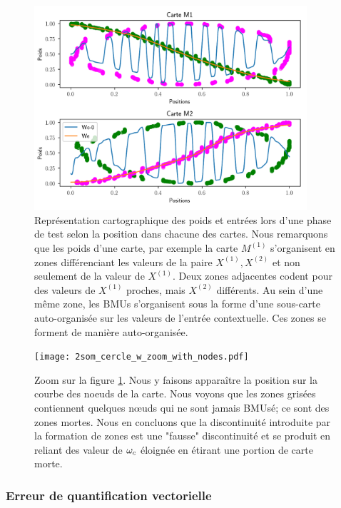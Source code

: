 \documentclass[../main]{subfiles}
\begin{document}
\begin{figure}
	\centering\includegraphics[width=0.9\textwidth]{2som_cercle_w.pdf}
	\caption{Représentation cartographique des poids et entrées lors d'une phase de test selon la position dans chacune des cartes. Nous remarquons que les poids d'une carte, par exemple la carte $M^{(1)}$ s'organisent en zones différenciant les valeurs de la paire $X^{(1)}, X^{(2)}$ et non seulement de la valeur de $X^{(1)}$. Deux zones adjacentes codent pour des valeurs de $X^{(1)}$ proches, mais $X^{(2)}$ différents. Au sein d'une même zone, les BMUs s'organisent sous la forme d'une sous-carte auto-organisée sur les valeurs de l'entrée contextuelle. Ces zones se forment de manière auto-organisée. \label{fig:w}}
\end{figure}

\begin{figure}
	\texttt{[image: 2som\_cercle\_w\_zoom\_with\_nodes.pdf]}
	\caption{Zoom sur la figure \ref{fig:w}. Nous y faisons apparaître la position sur la courbe des noeuds de la carte. Nous voyons que les zones grisées contiennent quelques n\oe{}uds qui ne sont jamais BMUsé; ce sont des zones mortes. Nous en concluons que la discontinuité introduite par la formation de zones est une "fausse" discontinuité et se produit en reliant des valeur de $\omega_c$ éloignée en étirant une portion de carte morte. \label{fig:w_zoom}}
\end{figure}


\subsubsection{Erreur de quantification vectorielle}
\end{document}
